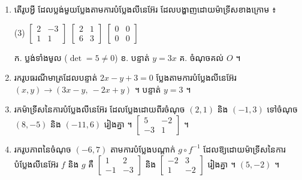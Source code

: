 \begin{enumerate}[1]
  \item តើរូបអ្វី ដែលប្លង់មួយប្លែងតាមការបំប្លែងលីនេអ៊ែរ ដែលបង្ហាញដោយម៉ាទ្រីសខាងក្រោម ៖
  \begin{tasks}(3)
    \task $\begin{bmatrix} 2 & -3\\ 1 & 1 \end{bmatrix}$
    \task $\begin{bmatrix} 2 & 1\\ 6 & 3 \end{bmatrix}$
    \task $\begin{bmatrix} 0 & 0\\ 0 & 0 \end{bmatrix}$
  \end{tasks}
  \ans
  ក. ប្លង់ទាំងមូល ($\det = 5 \ne 0$) \quad ខ. បន្ទាត់ $y = 3x$ \quad គ. ចំណុចគល់ $O$ ។
  \item រករូបធរណីមាត្រដែលបន្ទាត់ $2x - y + 3 = 0$ ប្លែងតាមការបំប្លែងលីនេអ៊ែរ $(x, y) \to (3x - y, \ -2x + y)$ ។
  \ans
  បន្ទាត់ $y = 3$ ។
  \item រកម៉ាទ្រីសនៃការបំប្លែងលីនេអ៊ែរ ដែលប្លែងដោយពីរចំណុច $(2, 1)$ និង $(-1, 3)$ ទៅចំណុច $(8, -5)$ និង $(-11, 6)$ រៀងគ្នា ។
  \ans
  $\begin{bmatrix} 5 & -2\\ -3 & 1 \end{bmatrix}$ ។
  \item រករូបភាពនៃចំណុច $(-6, 7)$ តាមការបំប្លែងបណ្ដាក់ $g\circ f^{-1}$ ដែលឱ្យដោយម៉ាទ្រីសនៃការបំប្លែងលីនេអ៊ែរ $f$ និង $g$ គឺ $\begin{bmatrix} 1 & 2\\ -1 & -3 \end{bmatrix}$ និង $\begin{bmatrix} -2 & 3\\ 1 & -2 \end{bmatrix}$ រៀងគ្នា ។
  \ans
  $(5, -2)$ ។
\end{enumerate}

